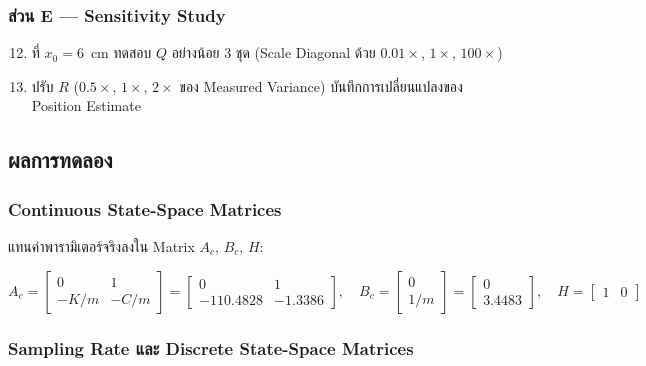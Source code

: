 \subsubsection{ส่วน E --- Sensitivity Study}

\begin{enumerate}
    \setcounter{enumi}{11}
    \item ที่ $x_0 = 6$~cm ทดสอบ $Q$ อย่างน้อย 3 ชุด
          (Scale Diagonal ด้วย $0.01\times$, $1\times$, $100\times$)
    \item ปรับ $R$ ($0.5\times$, $1\times$, $2\times$ ของ Measured Variance)
          บันทึกการเปลี่ยนแปลงของ Position Estimate
\end{enumerate}

\subsection{ผลการทดลอง}

\subsubsection{Continuous State-Space Matrices}

แทนค่าพารามิเตอร์จริงลงใน Matrix $A_c$, $B_c$, $H$:

\begin{equation}
    A_c = \begin{bmatrix} 0 & 1 \\ -K/m & -C/m \end{bmatrix}
        = \begin{bmatrix} 0 & 1 \\ -110.4828 & -1.3386 \end{bmatrix},
    \quad
    B_c = \begin{bmatrix} 0 \\ 1/m \end{bmatrix}
        = \begin{bmatrix} 0 \\ 3.4483 \end{bmatrix},
    \quad
    H = \begin{bmatrix} 1 & 0 \end{bmatrix}
    \label{eq:cont_matrices_numerical}
\end{equation}

\subsubsection{Sampling Rate และ Discrete State-Space Matrices}

